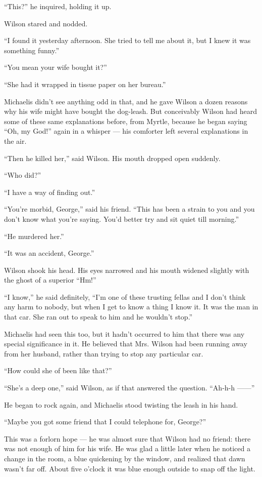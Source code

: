 \documentclass{znotebook}
\begin{document}
``This?'' he inquired, holding it up.

Wilson stared and nodded.

``I found it yesterday afternoon. She tried to tell me about it, but I knew it was something funny.''

``You mean your wife bought it?''

``She had it wrapped in tissue paper on her bureau.''

Michaelis didn't see anything odd in that, and he gave Wilson a dozen reasons why his wife might have bought the dog-leash. But conceivably Wilson had heard some of these same explanations before, from Myrtle, because he began saying ``Oh, my God!'' again in a whisper — his comforter left several explanations in the air.

``Then he killed her,'' said Wilson. His mouth dropped open suddenly.

``Who did?''

``I have a way of finding out.''

``You're morbid, George,'' said his friend. ``This has been a strain to you and you don't know what you're saying. You'd better try and sit quiet till morning.''

``He murdered her.''

``It was an accident, George.''

Wilson shook his head. His eyes narrowed and his mouth widened slightly with the ghost of a superior ``Hm!''

``I know,'' he said definitely, ``I'm one of these trusting fellas and I don't think any harm to nobody, but when I get to know a thing I know it. It was the man in that car. She ran out to speak to him and he wouldn't stop.''

Michaelis had seen this too, but it hadn't occurred to him that there was any special significance in it. He believed that Mrs. Wilson had been running away from her husband, rather than trying to stop any particular car.

``How could she of been like that?''

``She's a deep one,'' said Wilson, as if that answered the question. ``Ah-h-h ——''

He began to rock again, and Michaelis stood twisting the leash in his hand.

``Maybe you got some friend that I could telephone for, George?''

This was a forlorn hope — he was almost sure that Wilson had no friend: there was not enough of him for his wife. He was glad a little later when he noticed a change in the room, a blue quickening by the window, and realized that dawn wasn't far off. About five o'clock it was blue enough outside to snap off the light.
\end{document}
